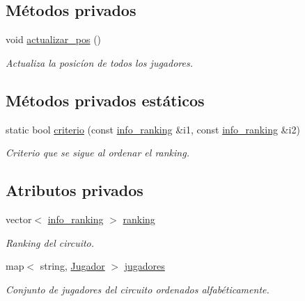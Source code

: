 \subsection*{Métodos privados}
\begin{DoxyCompactItemize}
\item 
void \hyperlink{class_cjt__jugadores_ac221d0fd27654e48e2c27560562a7d5a}{actualizar\+\_\+pos} ()
\begin{DoxyCompactList}\small\item\em Actualiza la posicíon de todos los jugadores. \end{DoxyCompactList}\end{DoxyCompactItemize}
\subsection*{Métodos privados estáticos}
\begin{DoxyCompactItemize}
\item 
static bool \hyperlink{class_cjt__jugadores_a9aff76f40c40d4856649fa97330fd0d0}{criterio} (const \hyperlink{struct_cjt__jugadores_1_1info__ranking}{info\+\_\+ranking} \&i1, const \hyperlink{struct_cjt__jugadores_1_1info__ranking}{info\+\_\+ranking} \&i2)
\begin{DoxyCompactList}\small\item\em Criterio que se sigue al ordenar el ranking. \end{DoxyCompactList}\end{DoxyCompactItemize}
\subsection*{Atributos privados}
\begin{DoxyCompactItemize}
\item 
vector$<$ \hyperlink{struct_cjt__jugadores_1_1info__ranking}{info\+\_\+ranking} $>$ \hyperlink{class_cjt__jugadores_a2a64dd6a0c9315af038dfdb4c27da059}{ranking}
\begin{DoxyCompactList}\small\item\em Ranking del circuito. \end{DoxyCompactList}\item 
map$<$ string, \hyperlink{class_jugador}{Jugador} $>$ \hyperlink{class_cjt__jugadores_ae3fc5f98e0f343b039bd7dff0e616ecc}{jugadores}
\begin{DoxyCompactList}\small\item\em Conjunto de jugadores del circuito ordenados alfabéticamente. \end{DoxyCompactList}\end{DoxyCompactItemize}


